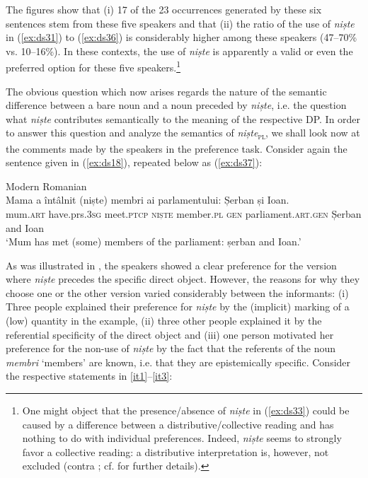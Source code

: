 \documentclass[output=paper,colorlinks,citecolor=brown]{langscibook}
\begin{document}
The figures show that (i) 17 of the 23 occurrences generated by these six sentences stem from these five speakers and that (ii) the ratio of the use of \textit{niște} in (\ref{ex:ds31}) to (\ref{ex:ds36}) is considerably higher among these speakers (47--70\% vs. 10--16\%). In these contexts, the use of \textit{niște} is apparently a valid or even the preferred option for these five speakers.\footnote{One might object that the presence/absence of \textit{niște} in (\ref{ex:ds33}) could be caused by a difference between a distributive/collective reading and has nothing to do with individual preferences. Indeed, \textit{niște} seems to strongly favor a collective reading: a distributive interpretation is, however, not excluded (contra \cite[208]{Nedelcu2009}; cf. \cite{Davatz2018} for further details).}\largerpage[1.5]

The obvious question which now arises regards the nature of the semantic difference between a bare noun and a noun preceded by \textit{niște}, i.e. the question what \textit{niște} contributes semantically to the meaning of the respective DP. In order to answer this question and analyze the semantics of \textit{niște}\textsubscript{\textsc{pl}}, we shall look now at the comments made by the speakers in the preference task. Consider again the sentence given in (\ref{ex:ds18}), repeated below as (\ref{ex:ds37}):

\ea\label{ex:ds37} Modern Romanian\\
\gll Mama     a        întâlnit   (niște) membri      ai parlamentului:   Șerban și    Ioan.\\
     mum.\textsc{art} have.prs.3\textsc{sg} meet.\textsc{ptcp}   \textsc{niște}   member.\textsc{pl} \textsc{gen} parliament.\textsc{art.gen}   Șerban and Ioan\\
\glt ‘Mum has met (some) members of the parliament: șerban and Ioan.’
\z

As was illustrated in , the speakers showed a clear preference for the version where \textit{niște} precedes the specific direct object. However, the reasons for why they choose one or the other version varied considerably between the informants: (i) Three people explained their preference for \textit{niște} by the (implicit) marking of a (low) quantity in the example, (ii) three other people explained it by the referential specificity of the direct object and (iii) one person motivated her preference for the non-use of \textit{niște} by the fact that the referents of the noun \textit{membri} ‘members’ are known, i.e. that they are epistemically specific. Consider the respective statements in \ref{it1}--\ref{it3}:\largerpage
\end{document}
